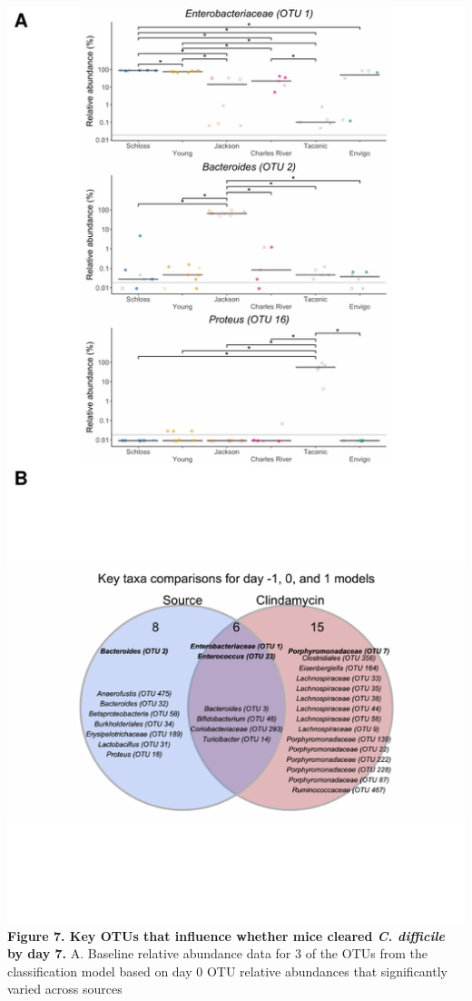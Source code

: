 \documentclass[11pt,]{article}
\begin{document}
\includegraphics{figure_7.pdf} \textbf{Figure 7. Key OTUs that influence
whether mice cleared \emph{C. difficile} by day 7.} A. Baseline relative
abundance data for 3 of the OTUs from the classification model based on
day 0 OTU relative abundances that significantly varied across sources
\end{document}
